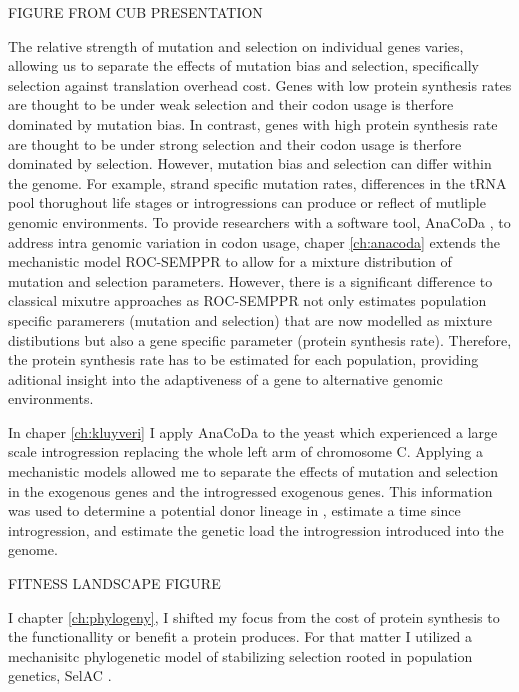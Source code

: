 FIGURE FROM CUB PRESENTATION

The relative strength of mutation and selection on individual genes varies, allowing us to separate the effects of mutation bias and selection, specifically selection against translation overhead cost.
Genes with low protein synthesis rates are thought to be under weak selection and their codon usage is therfore dominated by mutation bias.
In contrast, genes with high protein synthesis rate are thought to be under strong selection and their codon usage is therfore dominated by selection.
However, mutation bias and selection can differ within the genome.
For example, strand specific mutation rates, differences in the tRNA pool thorughout life stages or introgressions can produce or reflect of mutliple genomic environments.
To provide researchers with a software tool, AnaCoDa \cite{landerer2018}, to address intra genomic variation in codon usage, chaper \ref{ch:anacoda} extends the mechanistic model ROC-SEMPPR \cite{gilchrist2015} to allow for a mixture distribution of mutation and selection parameters.
However, there is a significant difference to classical mixutre approaches as ROC-SEMPPR not only estimates population specific paramerers (mutation and selection) that are now modelled as mixture distibutions but also a gene specific parameter (protein synthesis rate). 
Therefore, the protein synthesis rate has to be estimated for each population, providing aditional insight into the adaptiveness of a gene to alternative genomic environments.

In chaper \ref{ch:kluyveri} I apply AnaCoDa to the yeast \kluyveri which experienced a large scale introgression replacing the whole left arm of chromosome C.
Applying a mechanistic models allowed me to separate the effects of mutation and selection in the exogenous \kluyveri genes and the introgressed exogenous genes.
This information was used to determine a potential donor lineage in \gossypii, estimate a time since introgression, and estimate the genetic load the introgression introduced into the  \kluyveri genome.

FITNESS LANDSCAPE FIGURE

I chapter \ref{ch:phylogeny}, I shifted my focus from the cost of protein synthesis to the functionallity or benefit a protein produces.
For that matter I utilized a mechanisitc phylogenetic model of stabilizing selection rooted in population genetics, SelAC \cite{beaulieu2018}.






